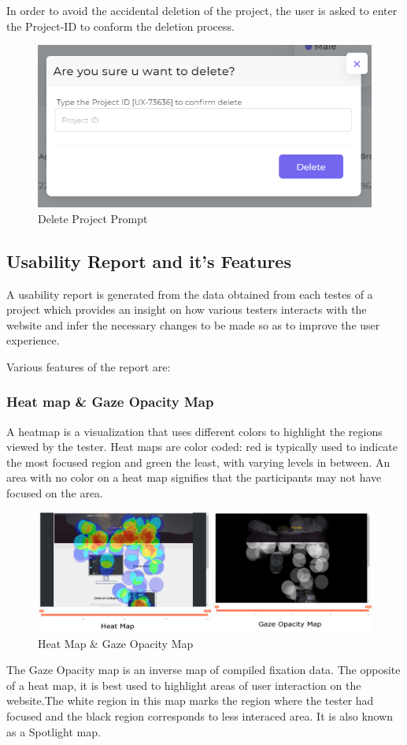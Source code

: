 \documentclass[12pt,a4paper,final]{extreport}
\begin{document}
In order to avoid the accidental deletion of the project, the user is asked to enter the Project-ID to conform the deletion process.
\begin{figure}[H]
    \centering
    \includegraphics[scale=.8]{delete-project.png}
    \caption{Delete Project Prompt}
\end{figure}

\newpage
\subsection{Usability Report and it's Features}
A usability report is generated from the data obtained from each testes of a project which provides an insight on how various testers interacts with the website and infer the necessary changes to be made so as to improve the user experience.

Various features of the report are:
\subsubsection{Heat map \& Gaze Opacity Map}
A heatmap is a visualization that uses different colors to highlight the regions viewed by the tester. Heat maps are color coded: red is typically used to indicate the most focused region and
green the least, with varying levels in between. An area with no color on a heat map signifies that the participants may not have focused on the area.
\begin{figure}[H]
    \centering
    \includegraphics[width=\linewidth]{heat & gaze map.png}
    \caption{Heat Map \& Gaze Opacity Map}
\end{figure}
The Gaze Opacity map is an inverse map of compiled fixation data. The opposite of a heat map, it is best used to highlight
areas of user interaction on the website.The white region in this map marks the region where the tester had focused and the black region corresponds to less interaced area.
It is also known as a Spotlight map.
\end{document}
